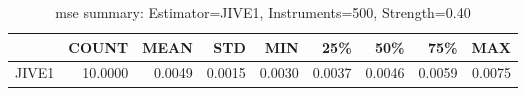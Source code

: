 \begin{table}[ht]
\centering
\caption{mse summary: Estimator=JIVE1, Instruments=500, Strength=0.40}
\begin{tabular}{lrrrrrrrr}
\toprule
 & COUNT & MEAN & STD & MIN & 25\% & 50\% & 75\% & MAX \\
\midrule
JIVE1 & 10.0000 & 0.0049 & 0.0015 & 0.0030 & 0.0037 & 0.0046 & 0.0059 & 0.0075 \\
\bottomrule
\end{tabular}
\end{table}
